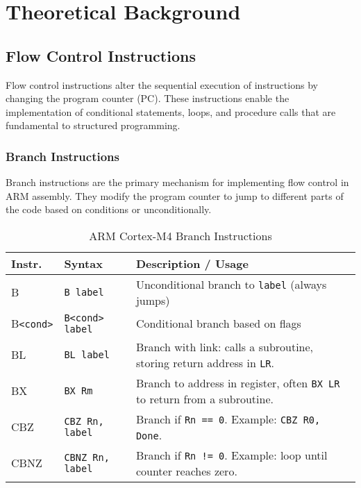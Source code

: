 \newpage
\tableofcontents
\newpage
\section{Theoretical Background}

\subsection{Flow Control Instructions}
Flow control instructions alter the sequential execution of instructions by changing the program counter (PC). These instructions enable the implementation of conditional statements, loops, and procedure calls that are fundamental to structured programming.

\subsubsection{Branch Instructions}
Branch instructions are the primary mechanism for implementing flow control in ARM assembly. They modify the program counter to jump to different parts of the code based on conditions or unconditionally.

\begin{table}[H]
\centering
\caption{ARM Cortex-M4 Branch Instructions}
\small
\begin{tabularx}{\linewidth}{@{}l l X@{}}
\toprule
\textbf{Instr.} & \textbf{Syntax} & \textbf{Description / Usage} \\
\midrule
B       & \texttt{B label}        & Unconditional branch to \texttt{label} (always jumps) \\
B\texttt{<cond>} & \texttt{B<cond> label}  & Conditional branch based on flags \\
BL      & \texttt{BL label}       & Branch with link: calls a subroutine, storing return address in \texttt{LR}. \\
BX      & \texttt{BX Rm}          & Branch to address in register, often \texttt{BX LR} to return from a subroutine. \\
CBZ     & \texttt{CBZ Rn, label}  & Branch if \texttt{Rn == 0}. Example: \texttt{CBZ R0, Done}. \\
CBNZ    & \texttt{CBNZ Rn, label} & Branch if \texttt{Rn != 0}. Example: loop until counter reaches zero. \\
\bottomrule
\end{tabularx}
\end{table}

